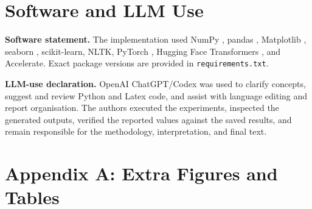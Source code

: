 \documentclass[twocolumn,10pt]{article}
\begin{document}
\clearpage

\nocite{lnproject2026}

\renewcommand{\refname}{Bibliography}



\section*{Software and LLM Use}

\textbf{Software statement.}
The implementation used NumPy \cite{harris2020numpy},
pandas \cite{mckinney2010pandas},
Matplotlib \cite{hunter2007matplotlib},
seaborn \cite{waskom2021seaborn},
scikit-learn, NLTK,
PyTorch \cite{paszke2019pytorch},
Hugging Face Transformers \cite{wolf2020transformers},
and Accelerate.
Exact package versions are provided in \texttt{requirements.txt}.

\textbf{LLM-use declaration.}
OpenAI ChatGPT/Codex was used to clarify concepts, suggest and review
Python and Latex code, and assist with language editing and report
organisation. The authors executed the experiments, inspected the
generated outputs, verified the reported values against the saved
results, and remain responsible for the methodology, interpretation,
and final text.

\onecolumn
\appendix

\section*{Appendix A: Extra Figures and Tables}
\end{document}

